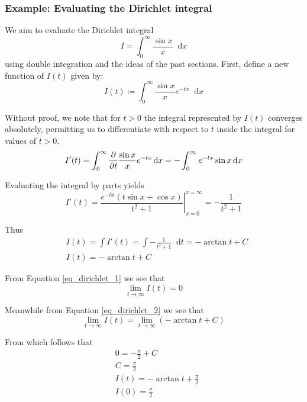 \documentclass[11pt, a4paper]{article}
\newcommand{\diff}{\mathop{}\!\mathrm{d}} %
\begin{document}
\subsubsection{Example: Evaluating the Dirichlet integral}
We aim to evaluate the Dirichlet integral
\begin{equation*}
	I = \int_{0}^{\infty}\frac{\sin x}{x} \diff x
\end{equation*}
using double integration and the ideas of the past sections. First, define a new function of $ I(t) $ given by:
\begin{equation}
	I(t) \coloneqq \int_{0}^{\infty}\frac{\sin x}{x}e^{-tx} \diff x \label{eq_dirichlet_1}
\end{equation}

Without proof, we note that for $ t > 0 $ the integral represented by $ I(t) $ converges absolutely, permitting us to differentiate with respect to $ t $ inside the integral for values of $ t > 0$.
\begin{equation*}
	I'(t) = \int_{0}^{\infty} \pdv{}{t} \frac{\sin x}{x}e^{-tx} \diff x = - \int_{0}^{\infty} e^{-tx} \sin x  \diff x
\end{equation*}

Evaluating the integral by parts yields
\begin{equation*}
	I'(t) = \left. \frac{e^{-tx}\left(t \sin x + \cos x\right)}{t^2 + 1}  \right|_{x=0}^{x = \infty} = -\frac{1}{t^2 + 1}
\end{equation*}

Thus
\begin{align}
	&I(t) = \int I'(t) = \int -\frac{1}{t^2 + 1} \diff t = -\arctan t + C\nonumber\\
	&I(t) = -\arctan t + C \label{eq_dirichlet_2}
\end{align}

From Equation \ref{eq_dirichlet_1} we see that 
\begin{equation*}
	\lim_{t\rightarrow \infty}I(t) = 0 
\end{equation*}

Meanwhile from Equation \ref{eq_dirichlet_2} we see that 
\begin{equation*}
	\lim_{t\rightarrow \infty}I(t) = \lim_{t\rightarrow \infty}(-\arctan t + C)
\end{equation*}

From which follows that 
\begin{align}
	&0 = -\frac{\pi}{2} + C\nonumber\\
	&C = \frac{\pi}{2}\nonumber\\
	&I(t) = -\arctan t + \frac{\pi}{2}\nonumber\\
	&I(0) = \frac{\pi}{2} \label{eq_dirichlet_3}
\end{align}
\end{document}
